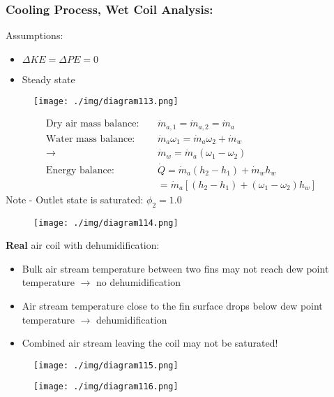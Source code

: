 \subsubsection{Cooling Process, Wet Coil Analysis:}
Assumptions:
\begin{itemize}[noitemsep]
  \item $\Delta KE = \Delta PE = 0$
  \item Steady state
\end{itemize}
\begin{figure}[H]
  \centering
  \texttt{[image: ./img/diagram113.png]}
  \caption{}
\end{figure}
\begin{align}
  \text{Dry air mass balance:} \ \ \ \ \  & \dot{m}_{a,1} = \dot{m}_{a,2} = \dot{m}_{a}                    \\[5pt]
  \text{Water mass balance:} \ \ \ \ \    & \dot{m}_{a}\omega_1 = \dot{m}_{a}\omega_2 + \dot{m}_{w}        \\[5pt]
  \longrightarrow \ \                     & \dot{m}_{w} = \dot{m}_{a}(\omega_1-\omega_2)                   \\[5pt]
  \text{Energy balance:} \ \ \ \ \        & \dot{Q} = \dot{m}_{a}(h_2-h_1) + \dot{m}_{w}h_{w}              \\[5pt]
                                          & = \dot{m}_{a}\left[(h_2-h_1) + (\omega_1-\omega_2)h_{w}\right]
\end{align}
Note - Outlet state is saturated: $\phi_2 = 1.0$
\begin{figure}[H]
  \centering
  \texttt{[image: ./img/diagram114.png]}
  \caption{}
\end{figure}
\textbf{Real} air coil with dehumidification:
\begin{itemize}[noitemsep]
  \item Bulk air stream temperature between two fins may not reach dew point temperature $\longrightarrow$ no dehumidification
  \item Air stream temperature close to the fin surface drops below dew point temperature $\longrightarrow$ dehumidification
  \item Combined air stream leaving the coil may not be saturated!
\end{itemize}
\begin{figure}[H]
  \centering
  \texttt{[image: ./img/diagram115.png]}
  \caption{}
\end{figure}
\begin{figure}[H]
  \centering
  \texttt{[image: ./img/diagram116.png]}
  \caption{}
\end{figure}
